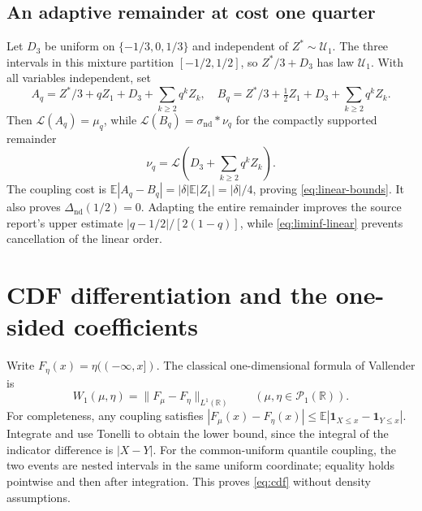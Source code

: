 \documentclass[11pt,letterpaper]{article}
\theoremstyle{remark}\newtheorem{remark}[theorem]{Remark}
\newcommand{\R}{\mathbb R}\newcommand{\E}{\mathbb E}
\newcommand{\Un}{\mathcal U}\newcommand{\Law}{\mathcal L}
\newcommand{\Pone}{\mathcal P_1(\R)}
\begin{document}
\subsection{An adaptive remainder at cost one quarter}
Let $D_3$ be uniform on $\{-1/3,0,1/3\}$ and independent of $Z^*\sim\Un_1$. The three intervals in this mixture partition $[-1/2,1/2]$, so $Z^*/3+D_3$ has law $\Un_1$. With all variables independent, set
\[
A_q=Z^*/3+qZ_1+D_3+\sum_{k\ge2}q^kZ_k,
\quad
B_q=Z^*/3+\tfrac12Z_1+D_3+\sum_{k\ge2}q^kZ_k.
\]
Then $\Law(A_q)=\mu_q$, while $\Law(B_q)=\sigma_{\mathrm{nd}}*\nu_q$ for the compactly supported remainder
\[
\nu_q=\Law\left(D_3+\sum_{k\ge2}q^kZ_k\right).
\]
The coupling cost is $\E|A_q-B_q|=|\delta|\E|Z_1|=|\delta|/4$, proving \eqref{eq:linear-bounds}. It also proves $\Delta_{\mathrm{nd}}(1/2)=0$. Adapting the entire remainder improves the source report's upper estimate $|q-1/2|/[2(1-q)]$, while \eqref{eq:liminf-linear} prevents cancellation of the linear order.

\section{CDF differentiation and the one-sided coefficients}\label{sec:cone}

Write $F_\eta(x)=\eta(( -\infty,x])$. The classical one-dimensional formula of Vallender \cite{Vallender} is
\begin{equation}\label{eq:cdf}
W_1(\mu,\eta)=\|F_\mu-F_\eta\|_{L^1(\R)}\qquad(\mu,\eta\in\Pone).
\end{equation}
For completeness, any coupling satisfies
$|F_\mu(x)-F_\eta(x)|\le\E|\mathbf1_{X\le x}-\mathbf1_{Y\le x}|$.
Integrate and use Tonelli to obtain the lower bound, since the integral of the indicator difference is $|X-Y|$. For the common-uniform quantile coupling, the two events are nested intervals in the same uniform coordinate; equality holds pointwise and then after integration. This proves \eqref{eq:cdf} without density assumptions.
\end{document}

